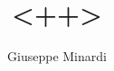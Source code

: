 \documentclass[12pt, twoside]{article}
\title{<++>}
\author{Giuseppe Minardi}
\begin{document}
\sloppy
\maketitle

\tableofcontents
\end{document}

